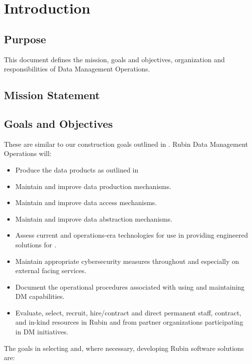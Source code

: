 \section {Introduction}\label{sec:intro}
\subsection{Purpose}
This document defines the mission, goals and objectives, organization and responsibilities of
 \VRO Data Management Operations.

\subsection{Mission Statement}


\subsection{Goals and Objectives}
These are similar to our construction goals outlined in .
Rubin Data Management Operations will:
\begin{itemize}
\item Produce the data products as outlined in 
\item Maintain and improve data production mechanisms.
\item Maintain and improve data access mechanisms.
\item Maintain and improve data abstraction mechanisms.
\item Assess current and operations-era technologies for use in providing engineered solutions for \VRO.
\item Maintain appropriate cybersecurity measures throughout \VRO and especially on external facing services.
\item Document the operational procedures associated with using and maintaining DM capabilities.
\item Evaluate, select, recruit, hire/contract and direct permanent staff, contract, and in-kind resources in Rubin and from partner organizations participating in DM initiatives.

\end{itemize}


The goals in selecting and, where necessary, developing Rubin software solutions are:

